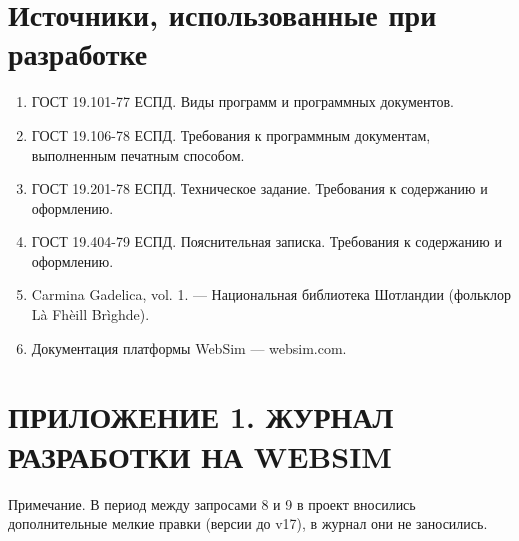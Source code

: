 \documentclass[12pt]{article}
\begin{document}
\section{Источники, использованные при разработке}
\begin{enumerate}
\item ГОСТ 19.101-77 ЕСПД. Виды программ и программных документов.
\item ГОСТ 19.106-78 ЕСПД. Требования к программным документам, выполненным печатным способом.
\item ГОСТ 19.201-78 ЕСПД. Техническое задание. Требования к содержанию и оформлению.
\item ГОСТ 19.404-79 ЕСПД. Пояснительная записка. Требования к содержанию и оформлению.
\item Carmina Gadelica, vol. 1. — Национальная библиотека Шотландии (фольклор Là Fhèill Brìghde).
\item Документация платформы WebSim — websim.com.
\end{enumerate}

\clearpage
\section*{\centering ПРИЛОЖЕНИЕ 1. ЖУРНАЛ РАЗРАБОТКИ НА WEBSIM}


\noindent Примечание. В период между запросами 8 и 9 в проект вносились дополнительные мелкие правки (версии до v17), в журнал они не заносились.

\changelist
\end{document}
